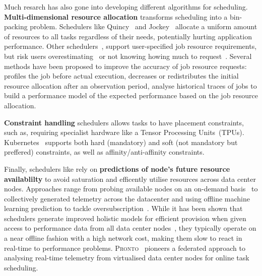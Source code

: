 Much resarch has also gone into developing different algorithms for scheduling.
\textbf{Multi-dimensional resource allocation} transforms scheduling into a bin-packing
problem. Schedulers like Quincy~\cite{126} and Jockey~\cite{136} allocate a
uniform amount of resources to all tasks regardless of their needs, potentially
hurting application performance. Other schedulers~\cite{56, 138, 134,149}, support
user-specified job resource requirements, but risk users
overestimating~\cite{123} or not knowing howing much to request~\cite{4}.
Several methods have been proposed to improve the accuracy of job resource
requests: \cite{138} profiles the job before actual execution, \cite{56,140}
decreases or redistributes the initial resource allocation after an observation
period, \cite{142, 143, 144} analyse historical traces of jobs to build a
performance model of the expected performance based on the job resource
allocation.

\textbf{Constraint handling} schedulers allows tasks to have placement constraints, such
as, requiring specialist hardware like a Tensor Processing
Units~\cite{146}(TPUs). Kubernetes~\cite{} supports both hard (mandatory) and
soft (not mandatory but preffered) constraints, as well as
affinity/anti-affinity constraints.


Finally, schedulers like \cite{Boutin-et-al.,-2014;-Karanasos-et-al.,-2015;-Verma-et-al.,-2015;-Gog-et-al.,-2016;-Mao-et-al.,-2019;-Ousterhout-et-al.,-2013b}
rely on \textbf{predictions of node's future resource
availablilty} to avoid saturation and efficently utilise resources across data
center nodes. Approaches range from probing available nodes on an on-demand
basis~\cite{Ousterhout-et-al.,-2013b;-Verma-et-al.,-2015} to collectively
generated telemetry across the datacenter and using offline machine learning
prediction to tackle oversubscription~\cite{Cortez-et-al.,-2017}. While it has
been shown that schedulers generate improved holistic models for efficient
provision when given access to performance data from all data center
nodes~\cite{Verma-et-al.,-2015;-Gog-et-al.,-2016;-Boutin-et-al.,-2014;-Mao-et-al.,-2019;-Cortez-et-al.,-2017}, they typically operate on a near offline
fashion with a high network cost, making them slow to react in real-time to
performance problems. \textsc{Pronto}~\cite{grammenos_pronto_2021} pioneers
a federated approach to analysing real-time telemetry from virtualised data
center nodes for online task scheduling.

